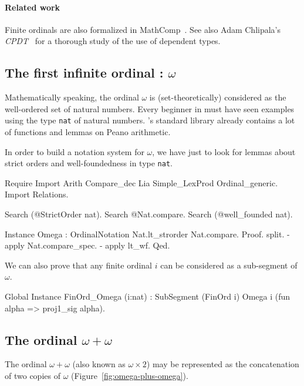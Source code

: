 \paragraph{Related work}
Finite ordinals are also formalized in MathComp~\cite{SSR}.  See also Adam Chlipala's \emph{CPDT}~\cite{chlipalacpdt2011} for a thorough study of the use of dependent types.

\subsection{The first infinite ordinal : \texorpdfstring{$\omega$}{omega}}

Mathematically speaking, the ordinal $\omega$ is (set-theoretically) considered as the well-ordered set of
natural numbers. 
Every beginner in \coq{} must have seen examples using the type \texttt{nat} of natural numbers. \coq's standard 
library already contains a lot of functions and lemmas on Peano arithmetic. 

In order to build a notation system for $\omega$, we have just to look for lemmas about strict orders and well-foundedness in type \texttt{nat}.

\begin{Coqsrc}
Require Import Arith Compare_dec Lia Simple_LexProd Ordinal_generic.
Import Relations.

Search (@StrictOrder nat).
Search @Nat.compare.
Search (@well_founded nat).
\end{Coqsrc}

\begin{Coqsrc}
Instance Omega : OrdinalNotation Nat.lt_strorder Nat.compare.
Proof.
 split.
 - apply Nat.compare_spec.
 - apply lt_wf.
Qed.
\end{Coqsrc}

We can also prove that any finite ordinal $i$ can be considered as a sub-segment of $\omega$.

\begin{Coqsrc}
Global Instance FinOrd_Omega (i:nat) :
  SubSegment (FinOrd i) Omega i 
             (fun alpha =>  proj1_sig alpha).
\end{Coqsrc}


\subsection{The ordinal \texorpdfstring{$\omega+\omega$}{omega + omega}}

The ordinal $\omega+\omega$ (also known as $\omega\times 2$) may be represented as the concatenation 
of two copies of $\omega$ (Figure~\ref{fig:omega-plus-omega}).

